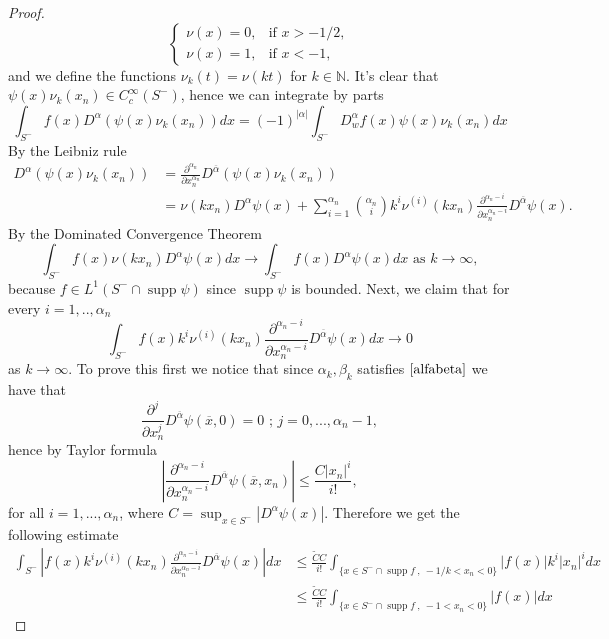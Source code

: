 \documentclass[12pt]{article}
\theoremstyle{definition}
\DeclareMathOperator\supp{supp}
\begin{document}
\begin{proof}
\[ \begin{cases}
	\nu(x)=0, & \text{if } x>-1/2, \\
	\nu(x)=1, & \text{if }x<-1,
\end{cases} 
\]
and we define the functions $\nu_k(t)=\nu(kt)$ for $k \in \mathbb{N}$. It's clear that $\psi(x) \nu_k(x_n) \in C^\infty_c(S^-)$, hence we can integrate by parts
\begin{equation}\label{parts}
\int_{S^-}  f(x)D^{\alpha}(\psi(x) \nu_k(x_n)) dx = (-1)^{|\alpha|}\int_{S^-} D^\alpha_w f(x)\psi(x) \nu_k(x_n) dx  
\end{equation}
By the Leibniz rule 
\begin{align*}
D^{\alpha}(\psi(x) \nu_k(x_n)) &=\frac{\partial^{\alpha_n}}{\partial x_n^{\alpha_n}} D^{\overline \alpha}(\psi(x) \nu_k(x_n)) \\
				        &= \nu(kx_n)D^{\alpha}\psi(x)+\sum_{i=1}^{\alpha_n}  {{\alpha_n}  \choose {i} }  k^i \nu^{(i)}(kx_n)\frac{\partial^{\alpha_n-i}}{\partial x_n^{\alpha_n-i}} D^{\overline \alpha}\psi(x).
\end{align*}
By the Dominated Convergence Theorem
\[ \int_{S^-} f(x) \nu(kx_n)D^{\alpha}\psi(x)dx  \rightarrow \int_{S^-} f(x) D^{\alpha}\psi(x)dx \text{    as } k\rightarrow \infty,\]
because $f \in L^1(S^- \cap \supp \psi)$ since $\supp \psi$ is bounded.
Next, we claim that for every $i=1,..,\alpha_n$
\begin{equation}\label{lim}
\int_{S^-}  f(x) k^i \nu^{(i)}(kx_n)\frac{\partial^{\alpha_n-i}}{\partial x_n^{\alpha_n-i}} D^{\overline \alpha}\psi(x)dx  \rightarrow 0 
\end{equation}
as $k \rightarrow \infty$. To prove this first we notice that since  $\alpha_k,\beta_k$ satisfies $\eqref{alfabeta}$ we have that 
\[   \frac{\partial^j}{\partial x_n^j} D^{\overline \alpha}\psi(\overline x, 0)=0 \text{  ;  }j=0,...,\alpha_n-1,\]
hence by Taylor formula 
\[  \left| \frac{\partial^{\alpha_n - i}}{\partial x_n^{\alpha_n - i}} D^{\overline \alpha}\psi(\overline x, x_n) \right|  \le \frac{C|x_n|^i}{i!},\]
for all $i=1,...,\alpha_n$, where $C= \sup_{x \in   S^-} |D^{\alpha} \psi(x)|$. Therefore we get the following estimate
\begin{align*}
   	\int_{S^-}  \left|  f(x) k^i \nu^{(i)}(kx_n)\frac{\partial^{\alpha_n-i}}{\partial x_n^{\alpha_n-i}} D^{\overline \alpha}\psi(x)     \right |  dx  &\le 
	 \frac{\widetilde CC}{i!} \int_{ \{ x \in S^-\cap \supp f \ , \ -1/k< x_n<0 \} }   |f(x)| k^i |x_n|^i  dx  \\
	& \le \frac{\widetilde CC}{i!}   \int_{ \{ x \in S^-\cap \supp f \ ,\  -1< x_n<0 \} }   |f(x)| dx 

\end{align*}
\end{proof}
\end{document}
